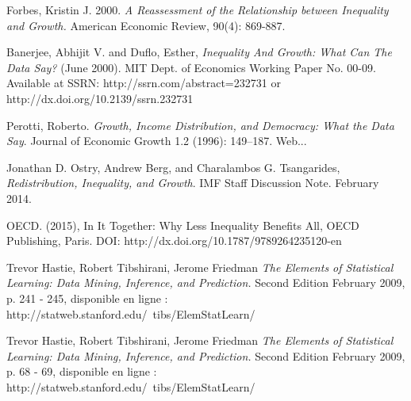 \documentclass[11pt,a4paper]{article}
\begin{document}
\begin{thebibliography}{99}
	Forbes, Kristin J. 2000. \emph{A Reassessment of the Relationship between Inequality and Growth.} American Economic Review, 90(4): 869-887.

Banerjee, Abhijit V. and Duflo, Esther, \emph{Inequality And Growth: What Can The Data Say?} (June 2000). MIT Dept. of Economics Working Paper No. 00-09. Available at SSRN: http://ssrn.com/abstract=232731 or http://dx.doi.org/10.2139/ssrn.232731 

Perotti, Roberto. \emph{Growth, Income Distribution, and Democracy: What the Data Say}. Journal of Economic Growth 1.2 (1996): 149–187. Web...

Jonathan D. Ostry, Andrew Berg, and Charalambos G. Tsangarides, \emph{Redistribution, Inequality, and Growth}. IMF Staff Discussion Note. February 2014. 

OECD.  (2015), In It Together: Why Less Inequality Benefits All, OECD Publishing, Paris.
DOI: http://dx.doi.org/10.1787/9789264235120-en

Trevor Hastie, Robert Tibshirani, Jerome Friedman \textit{The Elements of Statistical Learning: Data Mining, Inference, and Prediction.} Second Edition February 2009, p. 241 - 245, disponible en ligne : http://statweb.stanford.edu/~tibs/ElemStatLearn/

Trevor Hastie, Robert Tibshirani, Jerome Friedman \textit{The Elements of Statistical Learning: Data Mining, Inference, and Prediction.} Second Edition February 2009, p. 68 - 69, disponible en ligne : http://statweb.stanford.edu/~tibs/ElemStatLearn/

\end{thebibliography}
\end{document}
